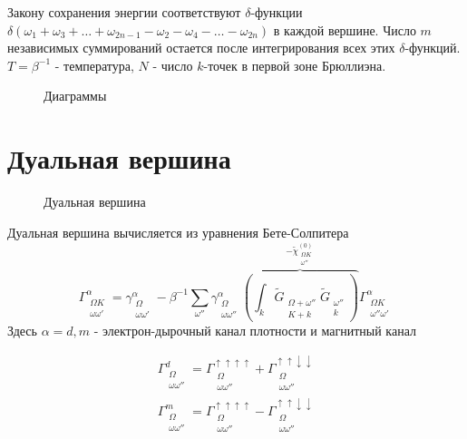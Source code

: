 \documentclass[11pt,a4paper]{report}
\begin{document}
Закону сохранения энергии соответствуют $\delta$-функции $\delta(\omega_1+\omega_3+\dots+\omega_{2n-1}-\omega_2-\omega_4-\dots-\omega_{2n})$ в каждой вершине.
Число $m$ независимых суммирований остается после интегрирования всех этих $\delta$-функций. $T = \beta^{-1}$ - температура, $N$ - число $k$-точек в первой зоне Брюллиэна.
 
\begin{figure}[H]
\label{diags}
\centering
\subfigure[\label{fig:diag0}]{\diagzero}
\subfigure[]{\diagtwoG}
\subfigure[]{\diagthreeGempty}
\subfigure[]{\begin{tikzpicture}[baseline=-35pt]{\node{\diagsixempty};}\end{tikzpicture}}
\caption{Диаграммы}
\end{figure}

\section{Дуальная вершина}

\begin{figure}[H]
\centering
\diagvertex
\caption{Дуальная вершина}
\end{figure}

Дуальная вершина вычисляется из уравнения Бете-Солпитера
\begin{equation}
\Gamma_{\substack{\Omega K\\ \omega\omega'}}^\alpha = \gamma^\alpha_{\substack{\Omega\\ \omega\omega'}} 
  - \beta^{-1} \sum_{\omega''}\gamma_{\substack{\Omega\\ \omega\omega''}}^\alpha
    \overbrace{\left(\int_k \tilde{G}_{\substack{\Omega+\omega''\\K+k}}\tilde{G}_{\substack{\omega''\\k}}\right)}^{-\tilde{\chi}^{(0)}_{\substack{\Omega K\\\omega''}}}
    \Gamma_{\substack{\Omega K\\\omega''\omega'}}^\alpha
\end{equation}
Здесь $\alpha=d,m$ -  электрон-дырочный канал плотности и магнитный канал

\begin{equation}
\begin{split}
  \Gamma_{\substack{\Omega\\ \omega\omega''}}^d =  \Gamma_{\substack{\Omega\\ \omega\omega''}}^{\uparrow\uparrow\uparrow\uparrow} + \Gamma_{\substack{\Omega\\ \omega\omega''}}^{\uparrow\uparrow\downarrow\downarrow} \\
  \Gamma_{\substack{\Omega\\ \omega\omega''}}^m =  \Gamma_{\substack{\Omega\\ \omega\omega''}}^{\uparrow\uparrow\uparrow\uparrow} - \Gamma_{\substack{\Omega\\ \omega\omega''}}^{\uparrow\uparrow\downarrow\downarrow}
\end{split}
\end{equation}
\end{document}

